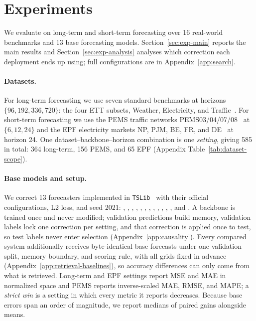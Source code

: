 \section{Experiments}
\label{sec:experiments}

We evaluate \method{} on long-term and short-term forecasting over 16 real-world
benchmarks and 13 base forecasting models. Section~\ref{sec:exp-main} reports the
main results and Section~\ref{sec:exp-analysis} analyses which correction each
deployment ends up using; full configurations are in Appendix~\ref{app:search}.

\paragraph{Datasets.}
For long-term forecasting we use seven standard benchmarks at horizons
$\{96,192,336,720\}$: the four ETT subsets, Weather, Electricity, and
Traffic~\citep{wang2024lib}. For short-term forecasting we use the PEMS traffic
networks PEMS03/04/07/08~\citep{Chen2001FreewayPM} at $\{6,12,24\}$ and the EPF
electricity markets NP, PJM, BE, FR, and DE~\citep{lago2021epf} at horizon 24.
One dataset--backbone--horizon combination is one \emph{setting}, giving 585 in
total: 364 long-term, 156 PEMS, and 65 EPF (Appendix
Table~\ref{tab:dataset-scope}).

\paragraph{Base models and setup.}
We correct 13 forecasters implemented in \texttt{TSLib}~\citep{wang2024lib} with
their official configurations, L2 loss, and seed 2021: \timexer{}, \timemixer{},
\pattn{}, \itransformer{}, \timesnet{}, \patchtst{}, \dlinear{}, \frets{},
\fedformer{}, \nonstat{}, \lightts{}, \informer{}, and \autoformer{}
\citep{wang2024timexer,wang2024timemixer,tan2024pattn,liu2024itransformer,
wu2023timesnet,patchtst,dlinear,yi2024frets,zhou2022fedformer,
Liu2022NonstationaryTR,lightts,zhou2021informer,wu2021autoformer}. A backbone is
trained once and never modified;
validation predictions build memory, validation labels lock one correction per
setting, and that correction is applied once to test, so test labels never enter
selection (Appendix~\ref{app:causality}). Every compared system additionally
receives byte-identical base forecasts under one validation split, memory boundary,
and scoring rule, with all grids fixed in advance
(Appendix~\ref{app:retrieval-baselines}), so accuracy differences can only come
from what is retrieved. Long-term and EPF settings report MSE and MAE in normalized
space and PEMS reports inverse-scaled MAE, RMSE, and MAPE; a \emph{strict win} is a
setting in which every metric it reports decreases. Because base errors span an
order of magnitude, we report medians of paired gains alongside means.

